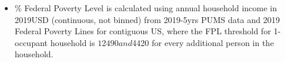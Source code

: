 \begin{itemize}
\item \% Federal Poverty Level is calculated using annual household income in 2019USD (continuous, not binned) from 2019-5yrs PUMS data and 2019 Federal Poverty Lines for contiguous US, where the FPL threshold for 1-occupant household is $12490 and $4420 for every additional person in the household.
\end{itemize}
